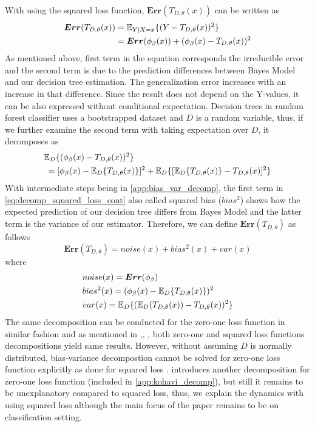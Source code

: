 With using the squared loss function, $\boldsymbol{Err}(T_{D,\theta}(x))$ can be written as
\begin{align}\label{eq:decomp_squared_loss}
\boldsymbol{Err}(T_{D, \theta}(x)) & = \mathbb{E}_{Y|X=x}\{(Y-T_{D,\theta}(x))^2\} \notag \\
							   	  & = \boldsymbol{Err}(\phi_{\beta}(x)) + (\phi_{\beta}(x)-T_{D,\theta}(x))^2
\end{align}
As mentioned above, first term in the equation corresponds the 
irreducible error and the second term is due to the prediction differences between Bayes Model and our decision tree estimation. 
The generalization error increases with an increase in that difference. Since the result does not depend on the Y-values, 
it can be also expressed without conditional expectation. Decision trees in random forest classifier uses a bootstrapped dataset 
and $D$ is a random variable, thus, if we further examine the second term with taking expectation over $D$, it decomposes as
\begin{align}\label{eq:decomp_squared_loss_cont}
	& \mathbb{E}_{D}\{(\phi_{\beta}(x) - T_{D,\theta}(x))^2 \} \notag \\
	& \: = [\phi_{\beta}(x) - \mathbb{E}_{D}\{T_{D,\theta}(x)\}]^2 + 
	\mathbb{E}_{D}\{[\mathbb{E}_{D}\{T_{D,\theta}(x)\} - T_{D,\theta}(x)]^2\}
\end{align}
With intermediate steps being in \autoref{app:bias_var_decomp}, 
the first term in \autoref{eq:decomp_squared_loss_cont} also called squared bias ($bias^2$) shows how the expected prediction of our 
decision tree differs from Bayes Model and the latter term is the variance of our estimator. 
Therefore, we can define $\boldsymbol{Err}(T_{D,\theta})$ as follows
\begin{equation}
\boldsymbol{Err}(T_{D,\theta}) = noise(x) + bias^2(x) + var(x)
\end{equation}
where
\begin{align}
& noise(x) = \boldsymbol{Err}(\phi_{\beta}) \notag \\
& bias^2(x) = (\phi_{\beta}(x) - \mathbb{E}_{D}\{T_{D,\theta}(x)\})^2 \notag \\
& var(x) = \mathbb{E}_{D}\{(\mathbb{E}_{D}(T_{D,\theta}(x)) - T_{D,\theta}(x))^2\} \notag
\end{align}
The same decomposition can be conducted for the zero-one loss function in similar fashion and as mentioned in 
\cite{louppe2014understanding},\cite{domingos2000decomposition}, 
\cite{james2003variance}, \cite{friedman1997zeroLoss}
both zero-one and squared loss functions decompositions yield same results. 
However, without assuming $D$ is normally distributed, bias-variance decompostion 
cannot be solved for zero-one loss function explicitly as done for squared loss \cite{louppe2014understanding}. 
\cite{kohavi1996bias} introduces another decomposition for zero-one loss function (included in \autoref{app:kohavi_decomp}), 
but still it remains to be unexplanatory compared to squared loss, thus, 
we explain the dynamics with using squared loss although the main focus of the paper remains to be on classification setting.

